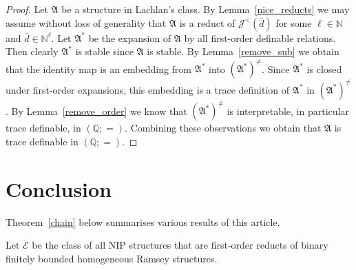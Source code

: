\documentclass{amsart}
\theoremstyle{definition}
\newtheorem{lemma}[theorem]{Lemma}
\theoremstyle{remark}
\numberwithin{equation}{section}
\DeclareMathOperator{\MI}{\operatorname{MI}}
\DeclareMathOperator{\HI}{\operatorname{HI}}
\newcommand\johnord[1]{\mathcal{J}^{<}(#1)}
\newcommand{\fa}{\mathfrak{A}}
\begin{document}
\begin{proof}
	Let $\fa$ be a structure in Lachlan's class. By Lemma~\ref{nice_reducts} we may assume without loss of generality that $\fa$ is a reduct of $\johnord{\bar{d}}$ for some $\ell\in \mathbb{N}$ and $\bar{d}\in \mathbb{N}^{\ell}$. Let $\fa^*$ be the expansion of $\fa$ by all first-order definable relations. Then clearly $\fa^*$ is stable since $\fa$ is stable. By Lemma~\ref{remove_sub} we obtain that the identity map is an embedding from $\fa^*$ into $(\fa^*)^{\neq}$. Since $\fa^*$ is closed under first-order expansions, this embedding is a trace definition of $\fa^*$ in $(\fa^*)^{\neq}$.
    By Lemma~\ref{remove_order}  we know that $(\fa^*)^{\neq}$ is interpretable, in particular trace definable, in $(\mathbb{Q};=)$. Combining these observations we obtain that $\fa$ is trace definable in $(\mathbb{Q};=)$.
\end{proof}


\section{Conclusion}
	Theorem~\ref{chain} below summarises various results of this article.
	
	Let $\mathcal E$ be the class of all NIP structures that are first-order reducts of binary finitely bounded homogeneous Ramsey structures.
\end{document}

